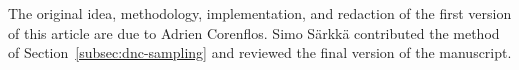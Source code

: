 The original idea, methodology, implementation, and redaction of the first version of this article are due to Adrien Corenflos. Simo S\"arkk\"a contributed the method of Section~\ref{subsec:dnc-sampling} and reviewed the final version of the manuscript.